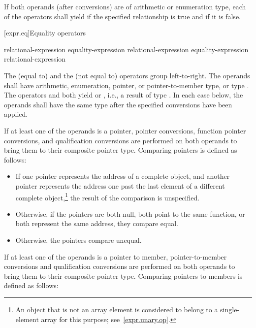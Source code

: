 \pnum
If both operands (after conversions) are of arithmetic or enumeration type, each
of the operators shall yield  if the specified relationship is true
and  if it is false.

[expr.eq]{Equality operators}%
%
%

\begin{bnf}
\br
    relational-expression\br
    equality-expression \terminal{==} relational-expression\br
    equality-expression \terminal{!=} relational-expression
\end{bnf}

\pnum
The \tcode{==} (equal to) and the \tcode{!=} (not equal to) operators
group left-to-right. The operands shall have arithmetic, enumeration, pointer,
or pointer-to-member type, or type . The operators
\tcode{==} and \tcode{!=} both yield  or , i.e., a
result of type . In each case below, the operands shall have the
same type after the specified conversions have been applied.

\pnum
{}%
%
If at least one of the operands is a pointer,
pointer conversions,
function pointer conversions, and
qualification conversions
are performed on both operands to bring them to their composite pointer type.
Comparing pointers is defined as follows:

\begin{itemize}
\item
If one pointer represents the address of a complete object, and another
pointer represents the address one past the last element of a different
complete object,\footnote{An object that is not an array element is
considered to belong to a single-element array for this purpose;
see~\ref{expr.unary.op}.} the result of the comparison is unspecified.
\item
Otherwise, if the pointers are both null, both point to the same
%
function, or both represent the same address,
they compare equal.
\item
Otherwise, the pointers compare unequal.
\end{itemize}

\pnum
If at least one of the operands is a pointer to member, pointer-to-member
conversions and qualification
conversions are performed on both operands to bring them to
their composite pointer type.
Comparing pointers to members is defined as follows:

